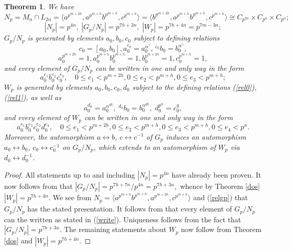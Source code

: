 \documentclass{amsart}
\newtheorem{theorem}{Theorem}[section]
\theoremstyle{definition}
\theoremstyle{remark}
\begin{document}
\begin{theorem}\label{main1} We have
$$
N_p=M_n\cap L_{2n}=\langle a^{p^{m+2h}}, a^{p^{m+h}}b^{p^{m+h}},c^{p^{m+h}}\rangle=
\langle b^{p^{m+2h}}, a^{p^{m+h}}b^{p^{m+h}},c^{p^{m+h}}\rangle
\cong C_{p^{2n}}\times  C_{p^{n}}\times C_{p^{n}};
$$
$$
|N_p|=p^{4n},\; |G_p/N_p|=p^{7h+3n},\; |W_p|=p^{7h+4n}=p^{7m-3n};
$$
$G_p/N_p$ is generated by elements $a_0,b_0,c_0$ subject to defining relations
\begin{equation}
\label{rel0}
c_0=[a_0,b_0], a_0^{c_0}=a_0^{\alpha^\gamma},\, {}^{c_0} b_0=b_0^{\alpha^\gamma},
\end{equation}
\begin{equation}
\label{rel1}
a_0^{p^{m+2h}}=1, a_0^{p^{m+h}}b_0^{p^{m+h}}=1, b_0^{p^{m+2h}}=1, c_0^{p^{m+h}}=1,
\end{equation}
and every element of $G_p/N_p$ can be written in one and only way in the form
\begin{equation}
\label{write}
a_0^{e_1} b_0^{e_2}c_0^{e_3},\quad 0\leq e_1<p^{m+2h}, 0\leq e_2<p^{m+h}, 0\leq e_3<p^{m+h};
\end{equation}
$W_p$ is generated by elements $a_0,b_0,c_0,d_0$ subject to the defining relations (\ref{rel0}), (\ref{rel1}),
as well as
\begin{equation}
\label{rel2}
a_0^{d_0}=a_0^{\alpha^{qk}},\; {}^{d_0} b_0=b_0^{\alpha^{qk}},\; d_0^{p^n}=c_0^q,
\end{equation}
and every element of $W_p$ can be written in one and only way in the form
$$
a_0^{e_1} b_0^{e_2}c_0^{e_3}d_0^{e_4},\quad 0\leq e_1<p^{m+2h}, 0\leq e_2<p^{m+h}, 0\leq e_3<p^{m+h}, 0\leq e_4<p^{n}.
$$
Moreover, the automorphism $a\leftrightarrow b$, $c\leftrightarrow c^{-1}$ of $G_p$ induces an automorphism $a_0\leftrightarrow b_0$, 
$c_0\leftrightarrow c_0^{-1}$ on $G_p/N_p$, which extends to an automorphism of $W_p$ via $d_0\leftrightarrow d_0^{-1}$.
\end{theorem}

\begin{proof} All statements up to and including $|N_p|=p^{4n}$ have already been proven. It now follows from \cite[Theorem 7.1]{MS} that
$
|G_p/N_p|=p^{7h+7n}/p^{4n}= p^{7h+3n},
$
whence by Theorem \ref{dos}
$
|W_p|=p^{7h+4n}.
$
We see from $N_p=\langle a^{p^{m+h}}b^{p^{m+h}},a^{p^{m+2h}},c^{p^{m+h}}\rangle$ and (\ref{relgp}) that
$G_p/N_p$ has the stated presentation. It follows from \cite[Lemma 6.1 or Theorem 7.1]{MS} that every element
of $G_p/N_p$ can the written as stated in (\ref{write}). Uniqueness follows from the fact that 
$|G_p/N_p|=p^{7h+3n}$. The remaining statements about $W_p$ now follow from Theorem \ref{dos} and $|W_p|=p^{7h+4n}$.
\end{proof}
\end{document}

